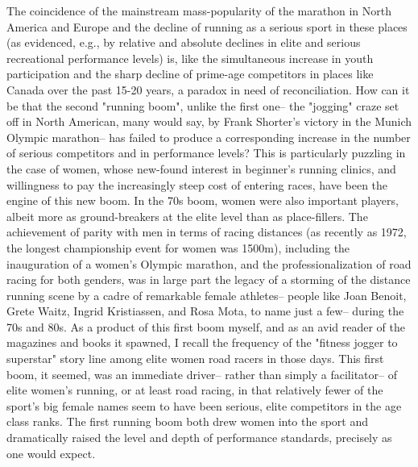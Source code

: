 The coincidence of the mainstream mass-popularity of the marathon in North America and Europe and the decline of running as a serious sport in these places (as evidenced, e.g., by relative and absolute declines in elite and serious recreational performance levels) is, like the simultaneous increase in youth participation and the sharp decline of prime-age competitors in places like Canada over the past 15-20 years, a paradox in need of reconciliation. How can it be that the second "running boom", unlike the first one-- the "jogging" craze set off in North American, many would say, by Frank Shorter's victory in the Munich Olympic marathon-- has failed to produce a corresponding increase in the number of serious competitors and in performance levels? This is particularly puzzling in the case of women, whose new-found interest in beginner's running clinics, and willingness to pay the increasingly steep cost of entering races, have been the engine of this new boom. In the 70s boom, women were also important players, albeit more as ground-breakers at the elite level than as place-fillers. The achievement of parity with men in terms of racing distances (as recently as 1972, the longest championship event for women was 1500m), including the inauguration of a women's Olympic marathon, and the professionalization of road racing for both genders, was in large part the legacy of a storming of the distance running scene by a cadre of remarkable female athletes-- people like Joan Benoit, Grete Waitz, Ingrid Kristiassen, and Rosa Mota, to name just a few-- during the 70s and 80s. As a product of this first boom myself, and as an avid reader of the magazines and books it spawned, I recall the frequency of the "fitness jogger to superstar" story line among elite women road racers in those days. This first boom, it seemed, was an immediate driver-- rather than simply a facilitator-- of elite women's running, or at least road racing, in that relatively fewer of the sport's big female names seem to have been serious, elite competitors in the age class ranks. The first running boom both drew women into the sport and dramatically raised the level and depth of performance standards, precisely as one would expect.

